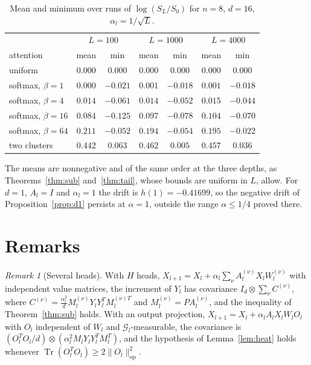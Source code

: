 \documentclass[11pt]{amsart}
\theoremstyle{definition}
\theoremstyle{remark}
\newtheorem{remark}[theorem]{Remark}
\numberwithin{equation}{section}
\newcommand{\cG}{\mathcal{G}}
\newcommand{\op}{\mathrm{op}}
\DeclareMathOperator{\Tr}{Tr}
\begin{document}
\begin{table}[ht]
\centering
\begin{tabular}{lcccccc}
\toprule
& \multicolumn{2}{c}{$L=100$} & \multicolumn{2}{c}{$L=1000$} & \multicolumn{2}{c}{$L=4000$}\\
attention & mean & min & mean & min & mean & min\\
\midrule
uniform & $0.000$ & $0.000$ & $0.000$ & $0.000$ & $0.000$ & $0.000$\\
softmax, $\beta=1$ & $0.000$ & $-0.021$ & $0.001$ & $-0.018$ & $0.001$ & $-0.018$\\
softmax, $\beta=4$ & $0.014$ & $-0.061$ & $0.014$ & $-0.052$ & $0.015$ & $-0.044$\\
softmax, $\beta=16$ & $0.084$ & $-0.125$ & $0.097$ & $-0.078$ & $0.104$ & $-0.070$\\
softmax, $\beta=64$ & $0.211$ & $-0.052$ & $0.194$ & $-0.054$ & $0.195$ & $-0.022$\\
two clusters & $0.442$ & $0.063$ & $0.462$ & $0.005$ & $0.457$ & $0.036$\\
\bottomrule
\end{tabular}
\caption{Mean and minimum over runs of $\log(S_L/S_0)$ for $n=8$, $d=16$, $\alpha_l=1/\sqrt L$.}\label{tab:sim}
\end{table}

The means are nonnegative and of the same order at the three depths, as Theorems~\ref{thm:sub} and~\ref{thm:tail}, whose bounds are uniform in $L$, allow. For $d=1$, $A_l=I$ and $\alpha_l=1$ the drift is $h(1)=-0.41699$, so the negative drift of Proposition~\ref{prop:d1} persists at $\alpha=1$, outside the range $\alpha\le1/4$ proved there.

\section{Remarks}\label{sec:remarks}

\begin{remark}[Several heads]\label{rem:heads}
With $H$ heads, $X_{l+1}=X_l+\alpha_l\sum_\nu A_l^{(\nu)}X_lW_l^{(\nu)}$ with independent value matrices, the increment of $Y_l$ has covariance $I_d\otimes\sum_\nu C^{(\nu)}$, where $C^{(\nu)}=\frac{\alpha_l^2}{d}M_l^{(\nu)}Y_lY_l^{T}M_l^{(\nu)T}$ and $M_l^{(\nu)}=PA_l^{(\nu)}$, and the inequality of Theorem~\ref{thm:sub} holds. With an output projection, $X_{l+1}=X_l+\alpha_lA_lX_lW_lO_l$ with $O_l$ independent of $W_l$ and $\cG_l$-measurable, the covariance is $(O_l^{T}O_l/d)\otimes(\alpha_l^2M_lY_lY_l^{T}M_l^{T})$, and the hypothesis of Lemma~\ref{lem:heat} holds whenever $\Tr(O_l^{T}O_l)\ge2\|O_l\|_\op^2$.
\end{remark}
\end{document}
